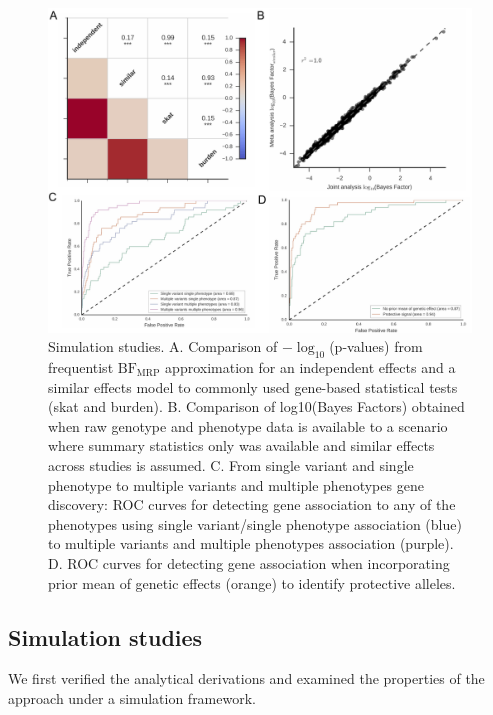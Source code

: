 \documentclass{nature}
\begin{document}
\newpage 
\begin{figure}
\centering
   \includegraphics[width=\textwidth]{../figures/Figure2Nov2017.pdf}
  \caption{Simulation studies. A. Comparison of $-\log_{10}$(p-values) from frequentist $\textrm{BF}_{\textrm{MRP}}$ approximation for an independent effects and a similar effects model to commonly used gene-based statistical tests (skat and burden). B. Comparison of log10(Bayes Factors) obtained when raw genotype and phenotype data is available to a scenario where summary statistics only was available and similar effects across studies is assumed. C. From single variant and single phenotype to multiple variants and multiple phenotypes gene discovery: ROC curves for detecting gene association to any of the phenotypes using single variant/single phenotype association (blue) to multiple variants and multiple phenotypes association (purple). D. ROC curves for detecting gene association when incorporating prior mean of genetic effects (orange) to identify protective alleles. }
  \label{Fig2}
\end{figure}

\subsection{Simulation studies}
We first verified the analytical derivations and examined the properties of the approach under a simulation framework. 

\end{document}
